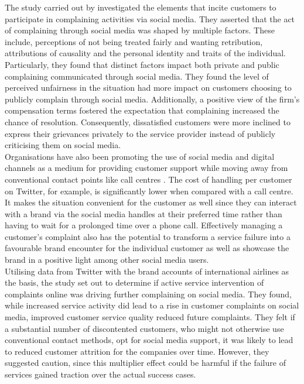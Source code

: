 The study carried out by \cite{balaji_customer_2015} investigated the elements that incite customers to participate in complaining activities via social media. They asserted that the act of complaining through social media was shaped by multiple factors. These include, perceptions of not being treated fairly and wanting retribution, attributions of causality and the personal identity and traits of the individual. Particularly, they found that distinct factors impact both private and public complaining communicated through social media. They found the level of perceived unfairness in the situation had more impact on customers choosing to publicly complain through social media. Additionally, a positive view of the firm's compensation terms fostered the expectation that complaining increased the chance of resolution. Consequently, dissatisfied customers were more inclined to express their grievances privately to the service provider instead of publicly criticising them on social media.\\

Organisations have also been promoting the use of social media and digital channels as a medium for providing customer support while moving away from conventional contact points like call centres \cite{sunDoesActiveService2021}. The cost of handling per customer on Twitter, for example, is significantly lower when compared with a call centre. It makes the situation convenient for the customer as well since they can interact with a brand via the social media handles at their preferred time rather than having to wait for a prolonged time over a phone call. Effectively managing a customer's complaint also has the potential to transform a service failure into a favourable brand encounter for the individual customer as well as showcase the brand in a positive light among other social media users.\\

Utilising data from Twitter with the brand accounts of international airlines as the basis, the study \cite{sunDoesActiveService2021} set out to determine if active service intervention of complaints online was driving further complaining on social media. They found, while increased service activity did lead to a rise in customer complaints on social media, improved customer service quality reduced future complaints. They felt if a substantial number of discontented customers, who might not otherwise use conventional contact methods, opt for social media support, it was likely to lead to reduced customer attrition for the companies over time. However, they suggested caution, since this multiplier effect could be harmful if the failure of services gained traction over the actual success cases.\\

